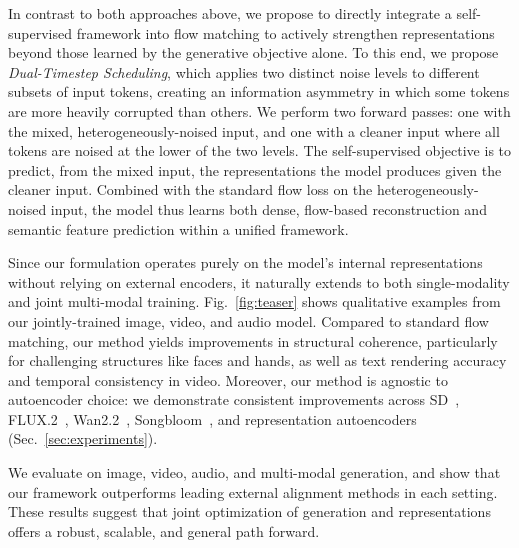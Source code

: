 In contrast to both approaches above, we propose to directly integrate a self-supervised framework into flow matching to actively strengthen representations beyond those learned by the generative objective alone.
To this end, we propose \emph{Dual-Timestep Scheduling}, which applies two distinct noise levels %
to different subsets of input tokens, creating an information asymmetry in which some tokens are more heavily corrupted than others. 
We perform two forward passes: one with the mixed, heterogeneously-noised input, and one with a cleaner input where all tokens are noised at the lower of the two levels.
The self-supervised objective is to predict, from the mixed input, the representations the model produces given the cleaner input. Combined with the standard flow loss on the heterogeneously-noised input, the model thus learns both dense, flow-based reconstruction and semantic feature prediction within a unified framework.

Since our formulation operates purely on the model's internal representations without relying on external encoders, it naturally extends to both single-modality and joint multi-modal training. Fig.~\ref{fig:teaser} shows qualitative examples from our jointly-trained image, video, and audio model. Compared to standard flow matching, our method yields improvements in structural coherence, particularly for challenging structures like faces and hands, as well as text rendering accuracy and temporal consistency in video. Moreover, our method is agnostic to autoencoder choice: we demonstrate consistent improvements across SD~\cite{ldm}, FLUX.2~\cite{bfl2025representation}, Wan2.2~\cite{wan2025}, Songbloom~\cite{yang2025songbloom}, and representation autoencoders~\cite{rae} (Sec.~\ref{sec:experiments}).

We evaluate on image, video, audio, and multi-modal generation, and show that our framework outperforms leading external alignment methods in each setting. These results suggest that joint optimization of generation and representations offers a robust, scalable, and general path forward.